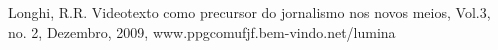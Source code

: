 \documentclass[
12pt,		%
openright,	%
twoside,  %
a4paper,			%
chapter=TITLE,		%
english,			%
french,				%
spanish,			%
brazil				%
]{USPSC-classe/USPSC}
\begin{document}
\begin{flushleft}
\begin{flushleft}
\begin{flushleft}
\begin{flushleft}
\begin{flushleft}
\begin{flushleft}
\begin{flushleft}
\begin{flushleft}
\begin{flushleft}
\begin{flushleft}
[Longhi, 2009] Longhi, R.R. Videotexto como precursor do jornalismo nos novos meios, Vol.3, no. 2, Dezembro, 2009, www.ppgcomufjf.bem-vindo.net/lumina
\end{flushleft}


\end{flushleft}


\end{flushleft}


\end{flushleft}


\end{flushleft}


\end{flushleft}


\end{flushleft}


\end{flushleft}


\end{flushleft}


\end{flushleft}
\end{document}
